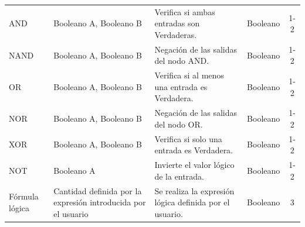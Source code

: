 \begin{table}[H]
\begin{tabularx}{\textwidth}{ l X X X c }
        AND              & Booleano A, Booleano B                                        & Verifica si ambas entradas son Verdaderas.                                         & Booleano        & 1-2                           \\
        NAND             & Booleano A, Booleano B                                        & Negación de las salidas del nodo AND.                                              & Booleano        & 1-2                           \\
        OR               & Booleano A, Booleano B                                        & Verifica si al menos una entrada es Verdadera.                                     & Booleano        & 1-2                           \\
        NOR              & Booleano A, Booleano B                                        & Negación de las salidas del nodo OR.                                               & Booleano        & 1-2                           \\
        XOR              & Booleano A, Booleano B                                        & Verifica si solo una entrada es Verdadera.                                         & Booleano        & 1-2                           \\
        NOT              & Booleano A                                                    & Invierte el valor lógico de la entrada.                                            & Booleano        & 1-2                           \\
        Fórmula lógica   & Cantidad definida por la expresión introducida por el usuario & Se realiza la expresión lógica definida por el usuario.                            & Booleano        & 3                             \\
        \hline
    \end{tabularx}
\end{table}

